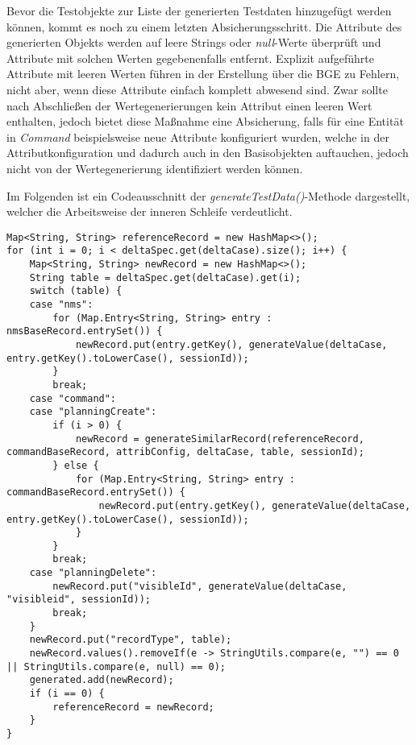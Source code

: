 Bevor die Testobjekte zur Liste der generierten Testdaten hinzugefügt werden können, kommt es noch zu einem letzten Absicherungsschritt. Die Attribute des generierten Objekts werden auf leere Strings oder \textit{null}-Werte überprüft und Attribute mit solchen Werten gegebenenfalls entfernt. Explizit aufgeführte Attribute mit leeren Werten führen in der Erstellung über die \ac{BGE} zu Fehlern, nicht aber, wenn diese Attribute einfach komplett abwesend sind. Zwar sollte nach Abschließen der Wertegenerierungen kein Attribut einen leeren Wert enthalten, jedoch bietet diese Maßnahme eine Absicherung, falls für eine Entität in \textit{Command} beispielsweise neue Attribute konfiguriert wurden, welche in der Attributkonfiguration und dadurch auch in den Basisobjekten auftauchen, jedoch nicht von der Wertegenerierung identifiziert werden können.

Im Folgenden ist ein Codeausschnitt der \textit{generateTestData()}-Methode dargestellt, welcher die Arbeitsweise der inneren Schleife verdeutlicht.

\begin{lstlisting}[caption=Innere Iterationsebene der Datengenerierung, label=innerLoop,style=Javastyle,basicstyle=\fontsize{9.5}{10.5}\ttfamily]
Map<String, String> referenceRecord = new HashMap<>();
for (int i = 0; i < deltaSpec.get(deltaCase).size(); i++) {
    Map<String, String> newRecord = new HashMap<>();
    String table = deltaSpec.get(deltaCase).get(i);
    switch (table) {
    case "nms":
        for (Map.Entry<String, String> entry : nmsBaseRecord.entrySet()) {
            newRecord.put(entry.getKey(), generateValue(deltaCase, entry.getKey().toLowerCase(), sessionId));
        }
        break;
    case "command":
    case "planningCreate":
        if (i > 0) {
            newRecord = generateSimilarRecord(referenceRecord, commandBaseRecord, attribConfig, deltaCase, table, sessionId);
        } else {
            for (Map.Entry<String, String> entry : commandBaseRecord.entrySet()) {
                newRecord.put(entry.getKey(), generateValue(deltaCase, entry.getKey().toLowerCase(), sessionId));
            }
        }
        break;
    case "planningDelete":
        newRecord.put("visibleId", generateValue(deltaCase, "visibleid", sessionId));
        break;
    }
    newRecord.put("recordType", table);
    newRecord.values().removeIf(e -> StringUtils.compare(e, "") == 0 || StringUtils.compare(e, null) == 0);
    generated.add(newRecord);
    if (i == 0) {
        referenceRecord = newRecord;
    }
}
\end{lstlisting}

